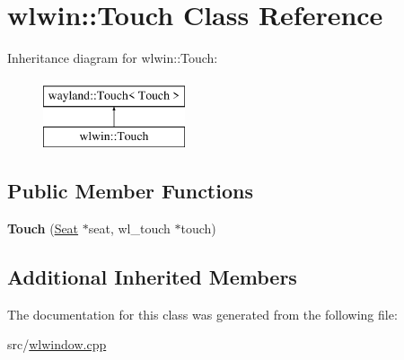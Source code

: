 \hypertarget{classwlwin_1_1Touch}{}\section{wlwin\+::Touch Class Reference}
\label{classwlwin_1_1Touch}
Inheritance diagram for wlwin\+::Touch\+:\begin{figure}[H]
\begin{center}
\leavevmode
\includegraphics[height=2.000000cm]{classwlwin_1_1Touch}
\end{center}
\end{figure}
\subsection*{Public Member Functions}
\begin{DoxyCompactItemize}
\item 
\mbox{\label{classwlwin_1_1Touch_afe4e02f4ea3ebde36615c7c4a444feed}} 
{\bfseries Touch} (\mbox{\hyperlink{classwlwin_1_1Seat}{Seat}} $\ast$seat, wl\+\_\+touch $\ast$touch)
\end{DoxyCompactItemize}
\subsection*{Additional Inherited Members}


The documentation for this class was generated from the following file\+:\begin{DoxyCompactItemize}
\item 
src/\mbox{\hyperlink{wlwindow_8cpp}{wlwindow.\+cpp}}\end{DoxyCompactItemize}

